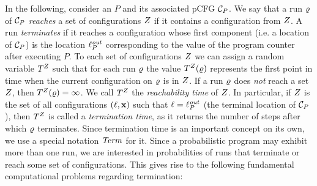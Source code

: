 \smallskip{}
In the following, consider an \APP{} $P$ and its associated pCFG $\mathcal{C}_P$. 
We say that a run $\varrho$ of $\mathcal{C}_P$ \emph{reaches} a set of configurations 
$Z$ if it  contains a configuration from $Z$. A run 
\emph{terminates} if it reaches a 
configuration whose first component (i.e. a location of $\mathcal{C}_P$) is the 
location
$\ell_{P}^{\mathit{out}}$ corresponding to the value of the program counter after 
executing $P$. 
To each set of configurations $Z$ we can assign a random variable 
$T^{Z}$ 
such that for each run $\varrho$ the value $T^{Z}(\varrho)$ represents 
the first 
point in time when 
the current configuration on $\varrho$ is in $Z$. If a run $\varrho$ does 
\emph{not} 
reach a set $Z$, then 
$T^{Z}(\varrho)=\infty$. We call $T^{Z}$ the 
\emph{reachability time} of $Z$. In particular, if $Z$ is the set 
of all configurations $(\ell,\mathbf{x})$ such that $\ell=\ell^{\mathit{out}}_P$ (the 
terminal location of $\mathcal{C}_P$), then $T^{Z}$ is 
called a \emph{termination time}, as it returns the number of steps after which 
$\varrho$ terminates. Since termination time is an important concept on its own, 
we use a special notation $\mathit{Term}$ for it.
Since a probabilistic program may exhibit more than one run, we are interested 
in probabilities of runs that terminate or reach some set of configurations. 
This gives rise to the following fundamental computational problems regarding 
termination:

